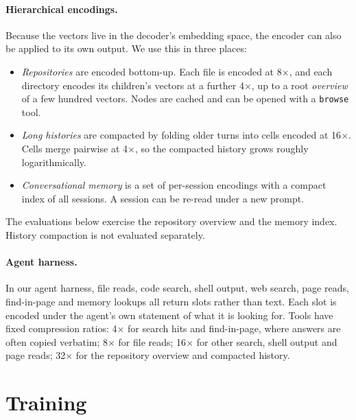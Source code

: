 \documentclass[11pt]{article}
\begin{document}
\paragraph{Hierarchical encodings.}
Because the vectors live in the decoder's embedding space, the encoder can also be applied to its
own output. We use this in three places:
\begin{itemize}
\item \emph{Repositories} are encoded bottom-up. Each file is encoded at 8$\times$, and each directory
  encodes its children's vectors at a further 4$\times$, up to a root \emph{overview} of a few
  hundred vectors. Nodes are cached and can be opened with a \texttt{browse} tool.
\item \emph{Long histories} are compacted by folding older turns into cells encoded at 16$\times$.
  Cells merge pairwise at 4$\times$, so the compacted history grows roughly logarithmically.
\item \emph{Conversational memory} is a set of per-session encodings with a compact index of all
  sessions. A session can be re-read under a new prompt.
\end{itemize}
The evaluations below exercise the repository overview and the memory index. History compaction is
not evaluated separately.

\paragraph{Agent harness.}
In our agent harness, file reads, code search, shell output, web search, page reads, find-in-page and
memory lookups all return slots rather than text. Each slot is encoded under the agent's own
statement of what it is looking for. Tools have fixed compression ratios: 4$\times$ for search hits
and find-in-page, where answers are often copied verbatim; 8$\times$ for file reads; 16$\times$ for
other search, shell output and page reads; 32$\times$ for the repository overview and compacted
history.

\section{Training}
\label{sec:training}
\end{document}
